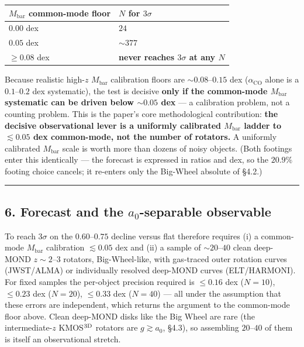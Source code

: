 \documentclass[
]{article}
\newcounter{none} %
\begin{document}
{\def\LTcaptype{none} %
\begin{longtable}[]{@{}ll@{}}
\toprule\noalign{}
\(M_\mathrm{bar}\) common-mode floor & \(N\) for \(3\sigma\) \\
\midrule\noalign{}
\endhead
\bottomrule\noalign{}
\endlastfoot
\(0.00\) dex & \(24\) \\
\(0.05\) dex & \(\sim377\) \\
\(\ge0.08\) dex & \textbf{never reaches \(3\sigma\) at any \(N\)} \\
\end{longtable}
}

Because realistic high-\(z\) \(M_\mathrm{bar}\) calibration floors are
\(\sim0.08\)--\(0.15\) dex (\(\alpha_\mathrm{CO}\) alone is a
\(0.1\)--\(0.2\) dex systematic), the test is decisive \textbf{only if
the common-mode \(M_\mathrm{bar}\) systematic can be driven below
\(\sim0.05\) dex} --- a calibration problem, not a counting problem.
This is the paper's core methodological contribution: \textbf{the
decisive observational lever is a uniformly calibrated \(M_\mathrm{bar}\)
ladder to \(\lesssim0.05\) dex common-mode, not the number of rotators.}
A uniformly calibrated \(M_\mathrm{bar}\) scale is worth more than dozens
of noisy objects. (Both footings enter this identically --- the forecast
is expressed in ratios and dex, so the \(20.9\%\) footing choice
cancels; it re-enters only the Big-Wheel absolute of §4.2.)

\begin{center}\rule{0.5\linewidth}{0.5pt}\end{center}

\subsection{\texorpdfstring{6. Forecast and the \(a_0\)-separable
observable}{6. Forecast and the a\_0-separable observable}}\label{forecast-and-the-a_0-separable-observable}

To reach \(3\sigma\) on the \(0.60\)--\(0.75\) decline versus flat
therefore requires (i) a common-mode \(M_\mathrm{bar}\) calibration
\(\lesssim0.05\) dex and (ii) a sample of \(\sim20\)--\(40\) clean
deep-MOND \(z\sim2\)--\(3\) rotators, Big-Wheel-like, with gas-traced
outer rotation curves (JWST/ALMA) or individually resolved deep-MOND
curves (ELT/HARMONI). For fixed samples the per-object precision
required is \(\le0.16\) dex (\(N=10\)), \(\le0.23\) dex (\(N=20\)),
\(\le0.33\) dex (\(N=40\)) --- all under the assumption that these
errors are independent, which returns the argument to the common-mode
floor above. Clean deep-MOND disks like the Big Wheel are rare (the
intermediate-\(z\) KMOS\(^{3\rm D}\) rotators are \(g\gtrsim a_0\),
§4.3), so assembling \(20\)--\(40\) of them is itself an observational
stretch.
\end{document}
